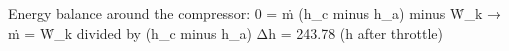 Energy balance around the compressor:  
0 = ṁ (h_c minus h_a) minus Ẇ_k → ṁ = Ẇ_k divided by (h_c minus h_a)  
Δh = 243.78 (h after throttle)